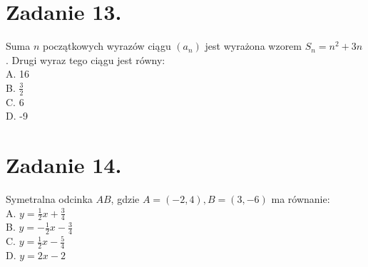 \documentclass[10pt]{article}
\begin{document}
\section*{Zadanie 13.}
Suma \(n\) początkowych wyrazów ciągu \(\left(a_{n}\right)\) jest wyrażona wzorem \(S_{n}=n^{2}+3 n\). Drugi wyraz tego ciągu jest równy:\\
A. 16\\
B. \(\frac{3}{2}\)\\
C. 6\\
D. -9

\section*{Zadanie 14.}
Symetralna odcinka \(A B\), gdzie \(A=(-2,4), B=(3,-6)\) ma równanie:\\
A. \(y=\frac{1}{2} x+\frac{3}{4}\)\\
B. \(y=-\frac{1}{2} x-\frac{3}{4}\)\\
C. \(y=\frac{1}{2} x-\frac{5}{4}\)\\
D. \(y=2 x-2\)
\end{document}
